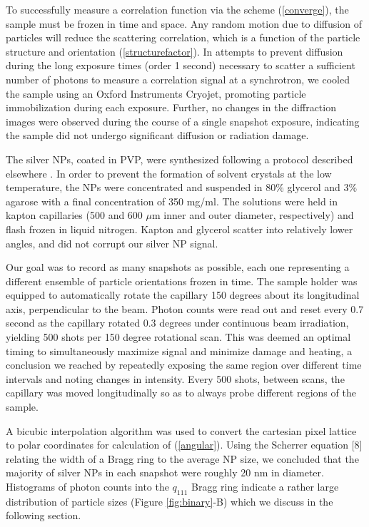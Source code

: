 \documentclass [11pt,fleqn]{article}
\begin{document}
To successfully measure a correlation function via the scheme (\ref{converge}), the sample must be frozen in time and space. Any random motion due to diffusion of particles will reduce the scattering correlation, which is a function of the particle structure and orientation (\ref{structurefactor}). In attempts to prevent diffusion during the long exposure times (order 1 second) necessary to scatter a sufficient number of photons to measure a correlation signal at a synchrotron, we cooled the sample using an Oxford Instruments Cryojet, promoting particle immobilization during each exposure. Further, no changes in the diffraction images were observed during the course of a single snapshot exposure, indicating the sample did not undergo significant diffusion or radiation damage.

The silver NPs, coated in PVP, were synthesized following a protocol described elsewhere \cite{Levard:2011bx}. In order to prevent the formation of solvent crystals at the low temperature, the NPs were concentrated and suspended in 80\% glycerol and 3\% agarose with a final concentration of 350 mg/ml. The solutions were held in kapton capillaries (500 and 600 $\mu$m inner and outer diameter, respectively) and flash frozen in liquid nitrogen. Kapton and glycerol scatter into relatively lower angles, and did not corrupt our silver NP signal.

Our goal was to record as many snapshots as possible, each one representing a different ensemble of particle orientations frozen in time. The sample holder was equipped to automatically rotate the capillary 150 degrees about its longitudinal axis, perpendicular to the beam. Photon counts were read out and reset every 0.7 second as the capillary rotated 0.3 degrees under continuous beam irradiation, yielding 500 shots per 150 degree rotational scan. This was deemed an optimal timing to simultaneously maximize signal and minimize damage and heating, a conclusion we reached by repeatedly exposing the same region over different time intervals and noting changes in intensity. Every 500 shots, between scans, the capillary was moved longitudinally so as to always probe different regions of the sample.

A bicubic interpolation algorithm was used to convert the cartesian pixel lattice to polar coordinates for calculation of (\ref{angular}). Using the Scherrer equation [8] relating the width of a Bragg ring to the average NP size, we concluded that the majority of silver NPs in each snapshot were roughly 20 nm in diameter. Histograms of photon counts into the $q_{111}$ Bragg ring indicate a rather large distribution of particle sizes (Figure \ref{fig:binary}-B) which we discuss in the following section.
\end{document}
